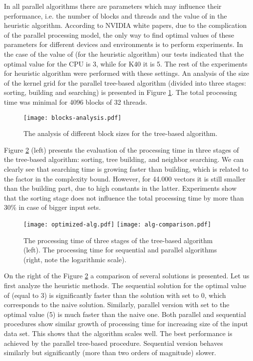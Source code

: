 \documentclass[a4paper]{article}
\begin{document}
In all parallel algorithms there are parameters which may influence their performance, i.e. the number of blocks and threads and the value of  in the heuristic algorithm. According to NVIDIA white papers, due to the complication of the parallel processing model, the only way to find optimal values of these parameters for different devices and environments is to perform experiments. In the case of the value of  (for the heuristic algorithm) our tests indicated that the optimal value for the CPU is 3, while for K40 it is 5. The rest of the experiments for heuristic algorithm were performed with these settings. An analysis of the size of the kernel grid for the parallel tree-based algorithm (divided into three stages: sorting, building and searching) is presented in Figure \ref{fig:blocks}. The total processing time was minimal for 4096 blocks of 32 threads. 

\begin{figure}[h]
\begin{center}
\texttt{[image: blocks-analysis.pdf]}
\end{center}
\caption{\label{fig:blocks} The analysis of different block sizes for the tree-based algorithm. }
\end{figure}

Figure \ref{fig:results} (left) presents the evaluation of the processing time in three stages of the tree-based algorithm: sorting, tree building, and neighbor searching. We can clearly see that searching time is growing faster than building, which is related to the  factor in the complexity bound. However, for 44.000 vectors it is still smaller than the building part, due to high constants in the latter. Experiments show that the sorting stage does not influence the total processing time by more than 30\% in case of bigger input sets. 

\begin{figure}[h]
\texttt{[image: optimized-alg.pdf]}
\texttt{[image: alg-comparison.pdf]}
\caption{\label{fig:results} The processing time of three stages of the tree-based algorithm (left). The processing time for sequential and parallel algorithms (right, note the logarithmic scale).}
\end{figure}

On the right of the Figure \ref{fig:results} a comparison of several solutions is presented. 
Let us first analyze the heuristic methods. The sequential solution for the optimal value of  (equal to 3) is significantly faster than the solution with  set to 0, which corresponds to the naive solution. 
Similarly, parallel version with  set to the optimal value (5) is much faster than the naive one. Both parallel and sequential procedures show similar growth of processing time for increasing size of the input data set. This shows that the algorithm scales well.
The best performance is achieved by the parallel tree-based procedure. Sequential version behaves similarly but significantly (more than two orders of magnitude) slower. 
\end{document}
